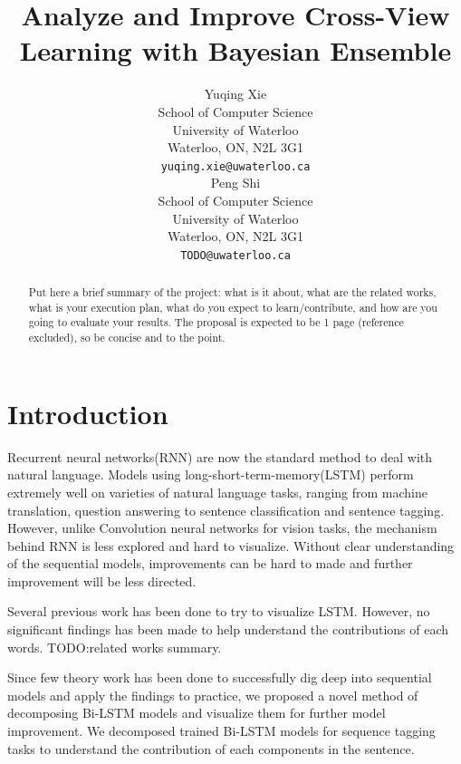 \documentclass{article}
\title{Analyze and Improve Cross-View Learning with Bayesian Ensemble}
\author{
	Yuqing Xie \\
	School of Computer Science\\
	University of Waterloo\\
	Waterloo, ON, N2L 3G1 \\
	\texttt{yuqing.xie@uwaterloo.ca} \\
	\And
	Peng Shi\\
	School of Computer Science\\
	University of Waterloo\\
	Waterloo, ON, N2L 3G1 \\
	\texttt{TODO@uwaterloo.ca} \\
}
\begin{document}
\maketitle

\begin{abstract}

Put here a brief summary of the project: what is it about, what are the related works, what is your execution plan, what do you expect to learn/contribute, and how are you going to evaluate your results. The proposal is expected to be 1 page (reference excluded), so be concise and to the point. 

\end{abstract}

\section{Introduction}

Recurrent neural networks(RNN) are now the standard method to deal with natural language. Models using long-short-term-memory(LSTM) perform extremely well on varieties of natural language tasks, ranging from machine translation, question answering to sentence classification and sentence tagging. However, unlike Convolution neural networks for vision tasks, the mechanism behind RNN is less explored and hard to visualize. Without clear understanding of the sequential models, improvements can be hard to made and further improvement will be less directed. 

Several previous work has been done to try to visualize LSTM. However, no significant findings has been made to help understand the contributions of each words. 
TODO:related works summary.

Since few theory work has been done to successfully dig deep into sequential models and apply the findings to practice, we proposed a novel method of decomposing Bi-LSTM models and visualize them for further model improvement. We decomposed trained Bi-LSTM models for sequence tagging tasks to understand the contribution of each components in the sentence. %
\end{document}
